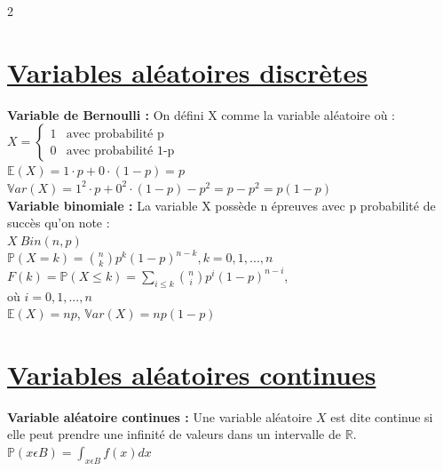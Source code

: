 \documentclass[11pt]{article}
\begin{document}





\begin{multicols}{2}
  \section{\underline{Variables aléatoires discrètes}}
  \textbf{Variable de Bernoulli :}
  On défini X comme la variable aléatoire où :\\
  $X = \begin{cases}
  1 & \text{avec probabilité p}\\
  0 & \text{avec probabilité 1-p}
  \end{cases}$\\
  $\mathbb{E}(X)=1\cdot p+0\cdot (1-p)=p$\\
  $\mathbb{V}ar(X)=1^2\cdot p+0^2\cdot (1-p)-p^2=p-p^2=p(1-p)$\\

  \textbf{Variable binomiale :}
  La variable X possède n épreuves avec p probabilité de succès qu'on note :\\
  $X~Bin(n,p)$\\
  $\mathbb{P}(X=k)=\binom{n}{k}p^k(1-p)^{n-k}, k=0,1, ... ,n$\\
  $F(k)=\mathbb{P}(X\leq k)=\sum_{i\leq k}\binom{n}{i}p^i(1-p)^{n-i}$, \\où $i=0,1, ... ,n$\\
  $\mathbb{E}(X)=np$, $\mathbb{V}ar(X)=np(1-p)$\\

  \section{\underline{Variables aléatoires continues}}


  \textbf{Variable aléatoire continues :} Une variable aléatoire $X$ est dite continue si elle peut prendre une infinité de valeurs dans un intervalle de $\mathbb{R}$. \\
  $\mathbb{P}(x \epsilon B) = \int_{x \epsilon B} f(x) dx$ \\
  


\end{multicols}
\end{document}
